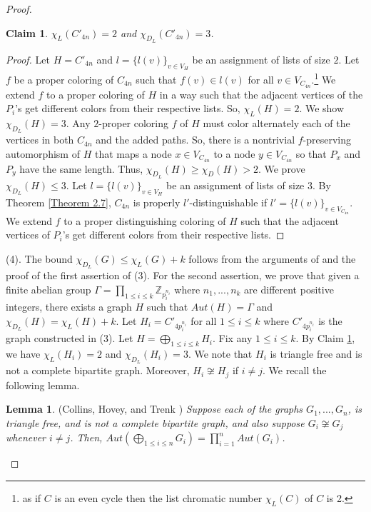 \documentclass[12pt,reqno,a4paper]{amsart}
\theoremstyle{definition}
\newtheorem{lem}[defn]{Lemma}
\newtheorem{claim}[defn]{Claim}
\begin{document}
\begin{proof}
\begin{claim}\label{Claim 5.2}
    {\em $\chi_L({C'_{4n}}) = 2$ and $\chi_{D_L}({C'_{4n}}) = 3$.}
\end{claim}	
\begin{proof}
Let $H=C'_{4n}$ and
$l=\{l(v)\}_{v\in V_{H}}$ be an assignment of lists of size $2$.
Let $f$ be a proper coloring of $C_{4n}$ such that $f(v) \in l(v)$ for all $v\in V_{C_{4n}}$.\footnote{as if $C$ is an even cycle then the list chromatic number $\chi_{L}(C)$ of $C$ is 2.} 
We extend $f$ to a proper coloring of $H$ in a way such that the adjacent vertices of the $P_{i}$'s get different colors from their respective lists. So, $\chi_L(H) = 2$.
We show $\chi_{D_L}(H)= 3$. Any $2$-proper  coloring $f$ of $H$ must color alternately each of the vertices in both $C_{4n}$ and the added paths. 
So, there is a nontrivial $f$-preserving automorphism of $H$ that maps a node $x\in V_{C_{4n}}$ to a node $y\in V_{C_{4n}}$ so that $P_{x}$ and $P_{y}$ have the same length.
Thus, $\chi_{D_L}(H)\geq \chi_{D}(H)> 2$.
We prove $\chi_{D_L}(H)\leq 3$. 
Let $l=\{l(v)\}_{v\in V_{H}}$ be an assignment of lists of size $3$. 
By Theorem \ref{Theorem 2.7}, $C_{4n}$ is properly $l'$-distinguishable if $l'=\{l(v)\}_{v\in V_{C_{4n}}}$. We extend $f$ to a proper distinguishing coloring of $H$ such that the adjacent vertices of $P_{i}$'s get different colors from their respective lists.
\end{proof}

(4). The bound $\chi_{D_{L}}(G)\leq \chi_{L}(G)+k$ follows from the arguments of \cite[Theorem 4.4]{CHT2009} and the proof of the first assertion of (3). For the second assertion, we prove that given a finite abelian group $\Gamma=\prod_{1\leq i\leq k} \mathbb{Z}_{p_{i}^{n_{i}}}$ where $n_{1},...,n_{k}$ are different positive integers, there exists a graph $H$ such that $Aut(H)=\Gamma$ and $\chi_{D_{L}}(H)=\chi_{L}(H)+k$.
Let $H_{i}=C'_{4p_{i}^{n_{i}}}$ for all $1\leq i\leq k$ where $C'_{4p_{i}^{n_{i}}}$ is the graph constructed in (3). Let $H = \bigoplus_{1\leq i\leq k} H_{i}$.  
Fix any $1\leq i\leq k$. By Claim \ref{Claim 5.2}, we have $\chi_L({H_{i}}) = 2$ and $\chi_{D_L}({H_{i}}) = 3$. We note that $H_{i}$ is triangle free and is not a complete bipartite graph. Moreover, $H_{i}\not\cong H_{j}$ if $i\neq j$. We recall the following lemma.

\begin{lem}\label{Lemma 5.3}{(Collins, Hovey, and Trenk \cite[Lemma 5.3]{CHT2009})}
{\em Suppose each of the graphs $G_{1},...,G_{n}$, is triangle free, and is not a
complete bipartite graph, and also suppose $G_{i} \not\cong G_{j}$ whenever $i \neq j$. Then, $Aut(\bigoplus_{1\leq i\leq n} G_{i}) = \prod_{i=1}^{n} Aut(G_{i})$.}
\end{lem}


\end{proof}
\end{document}
